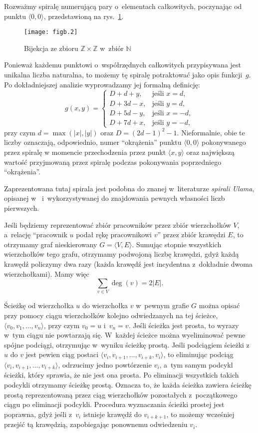Rozważmy spiralę numerującą pary o~elementach całkowitych, poczynając od punktu $\langle0,0\rangle$, przedstawioną na rys.~\ref{fig:B.3-4}.
\begin{figure}[ht]
	\begin{center}
		\texttt{[image: figb.2]}
	\end{center}
	\caption{Bijekcja ze zbioru $\mathbb{Z}\times\mathbb{Z}$ w~zbiór $\mathbb{N}$} \label{fig:B.3-4}
\end{figure}
Ponieważ każdemu punktowi o~współrzędnych całkowitych przypisywana jest unikalna liczba naturalna, to możemy tę spiralę potraktować jako opis funkcji~$g$. Po dokładniejszej analizie wyprowadzamy jej formalną definicję:
\[
	g(x,y) =
	\begin{cases}
		D+d+y, & \text{jeśli $x=d$}, \\
		D+3d-x, & \text{jeśli $y=d$}, \\
		D+5d-y, & \text{jeśli $x=-d$}, \\
		D+7d+x, & \text{jeśli $y=-d$},
	\end{cases}
\]
przy czym $d=\max(|x|,|y|)$ oraz $D=(2d-1)^2-1$. Nieformalnie, obie te liczby oznaczają, odpowiednio, numer ``okrążenia'' punktu $\langle0,0\rangle$ pokonywanego przez spiralę w momencie przechodzenia przez punkt $\langle x,y\rangle$ oraz największą wartość przyjmowaną przez spiralę podczas pokonywania poprzedniego ``okrążenia''.

Zaprezentowana tutaj spirala jest podobna do znanej w~literaturze \emph{spirali Ulama}, opisanej w~\cite{ulamspiral} i~wykorzystywanej do znajdowania pewnych własności liczb pierwszych.


\exercise %
Jeśli będziemy reprezentować zbiór pracowników przez zbiór wierzchołków $V$, a~relację ``pracownik $u$ podał rękę pracownikowi $v$'' przez zbiór krawędzi $E$, to otrzymamy graf nieskierowany $G=\langle V,E\rangle$. Sumując stopnie wszystkich wierzchołków tego grafu, otrzymamy podwojoną liczbę krawędzi, gdyż każdą krawędź policzymy dwa razy (każda krawędź jest incydentna z~dokładnie dwoma wierzchołkami). Mamy więc
\[
	\sum_{v\in V}\deg(v) = 2|E|.
\]

\exercise %
Ścieżkę od wierzchołka $u$ do wierzchołka $v$ w~pewnym grafie $G$ można opisać przy pomocy ciągu wierzchołków kolejno odwiedzanych na tej ścieżce, $\langle v_0,v_1,\dots,v_n\rangle$, przy czym $v_0=u$ i~$v_n=v$. Jeśli ścieżka jest prosta, to wyrazy w~tym ciągu nie powtarzają się. W~każdej ścieżce można wyeliminować pewne spójne podciągi, otrzymując w~wyniku ścieżkę prostą. Jeśli podciągiem ścieżki z~$u$ do $v$ jest pewien ciąg postaci $\langle v_i,v_{i+1},\dots,v_{i+k},v_i\rangle$, to eliminując podciąg $\langle v_i,v_{i+1},\dots,v_{i+k}\rangle$, odrzucimy jedno powtórzenie $v_i$, a~tym samym podcykl ścieżki, który sprawia, że nie jest ona prosta. Po eliminacji wszystkich takich podcykli otrzymamy ścieżkę prostą. Oznacza to, że każda ścieżka zawiera ścieżkę prostą reprezentowaną przez ciąg wierzchołków pozostałych z~początkowego ciągu po eliminacji podcykli. Procedura wyznaczania ścieżki prostej jest poprawna, gdyż jeśli z~$v_i$ istnieje krawędź do $v_{i+k+1}$, to możemy wcześniej przejść tą krawędzią, zapobiegając ponownemu odwiedzeniu $v_i$.

